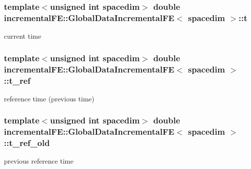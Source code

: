 \subsubsection[{\texorpdfstring{t}{t}}]{\setlength{\rightskip}{0pt plus 5cm}template$<$unsigned int spacedim$>$ double {\bf incremental\+F\+E\+::\+Global\+Data\+Incremental\+FE}$<$ spacedim $>$\+::t\hspace{0.3cm}{\ttfamily [private]}}\hypertarget{classincremental_f_e_1_1_global_data_incremental_f_e_abb14e15389af3772905a3c75e12ed2c0}{}\label{classincremental_f_e_1_1_global_data_incremental_f_e_abb14e15389af3772905a3c75e12ed2c0}
current time 
\subsubsection[{\texorpdfstring{t\+\_\+ref}{t_ref}}]{\setlength{\rightskip}{0pt plus 5cm}template$<$unsigned int spacedim$>$ double {\bf incremental\+F\+E\+::\+Global\+Data\+Incremental\+FE}$<$ spacedim $>$\+::t\+\_\+ref\hspace{0.3cm}{\ttfamily [private]}}\hypertarget{classincremental_f_e_1_1_global_data_incremental_f_e_a6ddf751a2f8abff9353d12e469e38f96}{}\label{classincremental_f_e_1_1_global_data_incremental_f_e_a6ddf751a2f8abff9353d12e469e38f96}
reference time (previous time) 
\subsubsection[{\texorpdfstring{t\+\_\+ref\+\_\+old}{t_ref_old}}]{\setlength{\rightskip}{0pt plus 5cm}template$<$unsigned int spacedim$>$ double {\bf incremental\+F\+E\+::\+Global\+Data\+Incremental\+FE}$<$ spacedim $>$\+::t\+\_\+ref\+\_\+old\hspace{0.3cm}{\ttfamily [private]}}\hypertarget{classincremental_f_e_1_1_global_data_incremental_f_e_ad808aad6cdbfa6eddad05fb85c056d11}{}\label{classincremental_f_e_1_1_global_data_incremental_f_e_ad808aad6cdbfa6eddad05fb85c056d11}
previous reference time 
